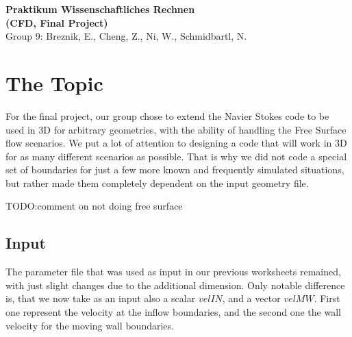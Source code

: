 \documentclass[a4paper, 12pt]{article}
\begin{document}
\begin{center}
{\LARGE \bf Praktikum Wissenschaftliches Rechnen \\ \vspace{0.2cm} (CFD, Final Project)}\\
\vspace{0.6cm}
{\small Group 9: Breznik, E., Cheng, Z., Ni, W., Schmidbartl, N.}
\end{center}
\normalfont
\section{The Topic}\label{sec:topic}
For the final project, our group chose to extend the Navier Stokes code to be used in 3D for arbitrary geometries, with the ability of handling
the Free Surface flow scenarios.
We put a lot of attention to designing a code that will work in 3D for as many different scenarios as possible. That is why we did not code a
special set of boundaries for just a few more known and frequently simulated situations, but rather made them completely dependent on the input
geometry file.

TODO:comment on not doing free surface
\subsection{Input}\label{sec:input}
The parameter file that was used as input in our previous worksheets remained, with just slight changes due to the additional dimension.
Only notable difference is, that we now take as an input also a scalar $velIN$, and a vector $velMW$. First one represent the velocity at the
inflow boundaries, and the second one the wall velocity for the moving wall boundaries. %
\end{document}
